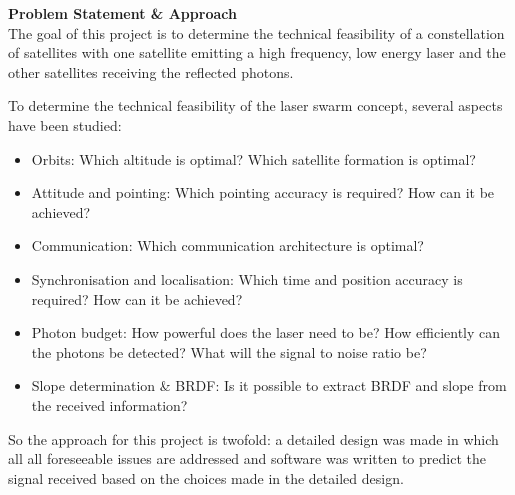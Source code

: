 \textbf{Problem Statement \& Approach}\\
The goal of this project is to determine the technical feasibility of a constellation of satellites with one satellite emitting a high frequency, low energy laser and the other satellites receiving the reflected photons.

To determine the technical feasibility of the laser swarm concept, several aspects have been studied:

\begin{itemize}
\item Orbits: Which altitude is optimal? Which satellite formation is optimal?
\item Attitude and pointing: Which pointing accuracy is required? How can it be achieved?
\item Communication: Which communication architecture is optimal?
\item Synchronisation and localisation: Which time and position accuracy is required? How can it be achieved?
\item Photon budget: How powerful does the laser need to be? How efficiently can the photons be detected? What will the signal to noise ratio be?
\item Slope determination \& BRDF: Is it possible to extract BRDF and slope from the received information?
\end{itemize}

So the approach for this project is twofold: a detailed design was made in which all all foreseeable issues are addressed and software was written to predict the signal received based on the choices made in the detailed design.